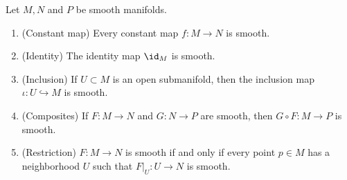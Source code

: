 \begin{theorem}\label{lem:construction of smooth maps}
    Let $M, N$ and $P$ be smooth manifolds.
    \begin{enumerate}
        \item (Constant map) Every constant map $f : M \to N$ is smooth.
        \item (Identity) The identity map $\id_M$ is smooth.
        \item (Inclusion) If $U \subset M$ is an open submanifold, then the inclusion map $\iota : U \hookrightarrow M$ is smooth.
        \item (Composites) If $F : M \to N$ and $G : N \to P$ are smooth, then $G \circ F : M \to P$ is smooth.
        \item (Restriction) $F : M \to N$ is smooth if and only if every point $p \in M$ has a neighborhood $U$ such that $F|_U : U \to N$ is smooth.
    \end{enumerate}
\end{theorem}

